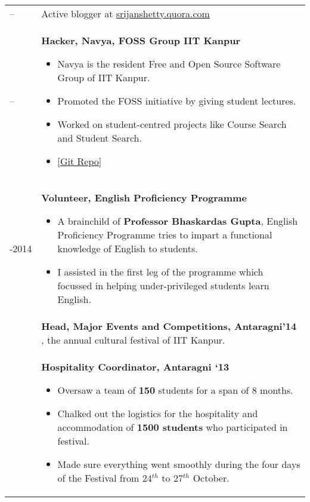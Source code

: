\documentclass[a4paper,10pt]{article} %
\begin{document}
\begin{tabular}{>{\raggedleft}p{2.2cm}p{14cm}}

    --   & Active blogger at \href{srijanshetty.quora.com} {srijanshetty.quora.com} \\

    --    & \textbf{Hacker, Navya, FOSS Group IIT Kanpur}
           \footnotesize{
               \begin{itemize}[leftmargin=*]
                   \item Navya is the resident Free and Open Source Software Group of IIT Kanpur.
                   \item Promoted the FOSS initiative by giving student lectures.
                   \item Worked on student-centred projects like Course Search and Student Search.
                   \item \href{https://github.com/navya} {[Git Repo]}
               \end{itemize}
           }\\

    2013-2014    & \textbf{Volunteer, English Proficiency Programme}
                   \footnotesize{
                       \begin{itemize}[leftmargin=*]
                           \item A brainchild of \textbf{Professor Bhaskardas Gupta}, English Proficiency
                               Programme tries to impart a functional knowledge of English to students.
                           \item I assisted in the first leg of the programme which focussed in helping
                               under-privileged students learn English.
                       \end{itemize}
                   }\\

    2014 & \textbf{Head, Major Events and Competitions, Antaragni'14} , the annual cultural festival of
    IIT Kanpur. \\

    2013 & \textbf{Hospitality Coordinator, Antaragni ‘13}
           \footnotesize{
               \begin{itemize}[leftmargin=*]
                   \item Oversaw a team of \textbf{150} students for a span of 8 months.
                   \item Chalked out the logistics for the hospitality and accommodation of \textbf{1500 students} who
                       participated in festival.
                   \item Made sure everything went smoothly during the four days of the Festival from 24$^{th}$
                       to 27$^{th}$ October.
               \end{itemize}
           }\\


\end{tabular}
\end{document}
